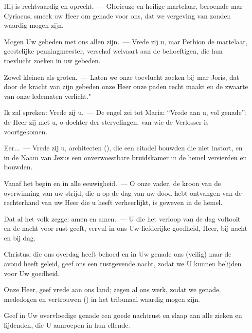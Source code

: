 \documentclass[12pt,twoside,a5paper]{article}
\begin{document}
\begin{halfparskip}
  Hij is rechtvaardig en oprecht.~--- Glorieuze en heilige martelaar, beroemde mar Cyriacus, smeek uw Heer om genade voor ons, dat we vergeving van zonden waardig mogen zijn.

  Mogen Uw gebeden met ons allen zijn.~--- Vrede zij u, mar Pethion de martelaar, geestelijke penningmeester, verschaf welvaart aan de behoeftigen, die hun toevlucht zoeken in uw gebeden.

  Zowel kleinen als groten.~--- Laten we onze toevlucht zoeken bij mar Joris, dat door de kracht van zijn gebeden onze Heer onze paden recht maakt en de zwaarte van onze ledematen verlicht."

  Ik zal spreken: Vrede zij u.~--- De engel zei tot Maria: ``Vrede aan u, vol genade''; de Heer zij met u, o dochter der stervelingen, van wie de Verlosser is voortgekomen.

  Eer...~--- Vrede zij u, architecten (), die een citadel bouwden die niet instort, en in de Naam van Jezus een onverwoestbare bruidskamer in de hemel versierden en bouwden.

  Vanaf het begin en in alle eeuwigheid.~--- O onze vader, de kroon van de overwinning van uw strijd, die u op de dag van uw dood hebt ontvangen van de rechterhand van uw Heer die u heeft verheerlijkt, is geweven in de hemel.

  Dat al het volk zegge: amen en amen.~--- U die het verloop van de dag voltooit en de nacht voor rust geeft, vervul in ons Uw liefderijke goedheid, Heer, bij nacht en bij dag.

  Christus, die ons overdag heeft behoed en in Uw genade ons (veilig) naar de avond heeft geleid, geef ons een rustgevende nacht, zodat we U kunnen belijden voor Uw goedheid.

  Onze Heer, geef vrede aan ons land; zegen al ons werk, zodat we genade, mededogen en vertrouwen () in het tribunaal waardig mogen zijn.

  Geef in Uw overvloedige genade een goede nachtrust en slaap aan alle zieken en lijdenden, die U aanroepen in hun ellende.
\end{halfparskip}

\end{document}
